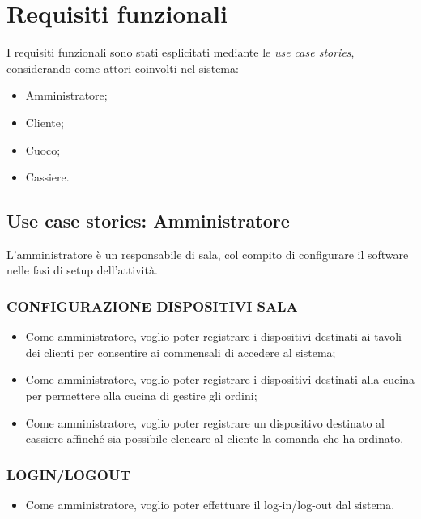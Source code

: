 \section{Requisiti funzionali}


I requisiti funzionali sono stati esplicitati mediante le \textit{use case stories}, considerando come attori coinvolti nel sistema: 
\begin{itemize}
	\item Amministratore;
	\item Cliente;
	\item Cuoco;
	\item Cassiere.
\end{itemize}


\subsection{Use case stories: Amministratore}
L’amministratore è un responsabile di sala, col compito di configurare il software nelle fasi di setup dell’attività.
\subsubsection{CONFIGURAZIONE DISPOSITIVI SALA} 
\begin{itemize}
	\item Come amministratore, voglio poter registrare i dispositivi destinati ai tavoli dei clienti per consentire ai commensali di accedere al sistema;
	\item Come amministratore, voglio poter registrare i dispositivi destinati alla cucina per permettere alla cucina di gestire gli ordini;
	\item Come amministratore, voglio poter registrare un dispositivo destinato al cassiere affinché sia possibile elencare al cliente la comanda che ha ordinato.
\end{itemize}

\subsubsection{LOGIN/LOGOUT} 
\begin{itemize}
	\item Come amministratore, voglio poter effettuare il log-in/log-out dal sistema.
\end{itemize}

